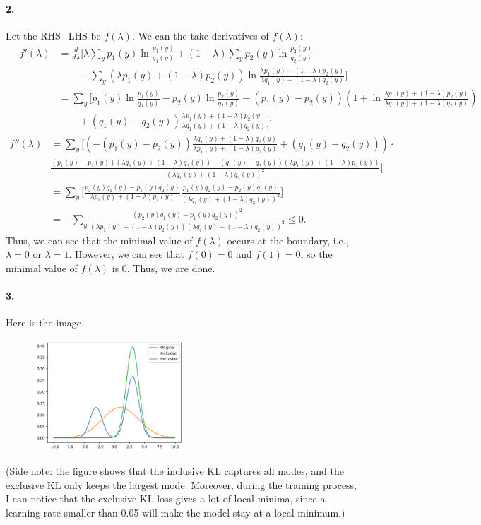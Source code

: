 \documentclass[a4 paper,12pt]{article}
\begin{document}
\paragraph*{2.} Let the RHS$-$LHS be $f(\lambda)$. We can the take derivatives of $f(\lambda)$:
\begin{align*}
\quad f'(\lambda)&=\frac{d}{d\lambda}\Big[\lambda\sum_{y}p_1(y)\ln \frac{p_1(y)}{q_1(y)}+(1-\lambda)\sum_{y}p_2(y)\ln \frac{p_2(y)}{q_2(y)}\\
&\qquad -\sum_{y}(\lambda p_1(y)+(1-\lambda)p_2(y))\ln \frac{\lambda p_1(y)+(1-\lambda)p_2(y)}{\lambda q_1(y)+(1-\lambda)q_2(y)}\Big]\\
&= \sum_{y}\Big[p_1(y)\ln \frac{p_1(y)}{q_1(y)}-p_2(y)\ln \frac{p_2(y)}{q_2(y)}-\left(p_1(y)-p_2(y)\right)\left(1+\ln \frac{\lambda p_1(y)+(1-\lambda)p_2(y)}{\lambda q_1(y)+(1-\lambda)q_2(y)}\right)\\
&\qquad +(q_1(y)-q_2(y))\frac{\lambda p_1(y)+(1-\lambda)p_2(y)}{\lambda q_1(y)+(1-\lambda)q_2(y)}\Big];
\end{align*}
\begin{align*}
f''(\lambda)&=\sum_y\Big[ \left(-(p_1(y)-p_2(y))\frac{\lambda q_1(y)+(1-\lambda)q_2(y)}{\lambda p_1(y)+(1-\lambda)p_2(y)}+(q_1(y)-q_2(y))\right)\cdot \\
&\frac{(p_1(y)-p_2(y))(\lambda q_1(y)+(1-\lambda)q_2(y))-(q_1(y)-q_2(y))(\lambda p_1(y)+(1-\lambda)p_2(y))}{(\lambda q_1(y)+(1-\lambda)q_2(y))^2}\Big]\\
&=\sum_y\Big[\frac{p_2(y)q_1(y)-p_1(y)q_2(y)}{\lambda p_1(y)+(1-\lambda)p_2(y)} \frac{p_1(y)q_2(y)-p_2(y)q_1(y)}{(\lambda q_1(y)+(1-\lambda)q_2(y))^2}\Big]\\
&=-\sum_y\frac{(p_2(y)q_1(y)-p_1(y)q_2(y))^2}{(\lambda p_1(y)+(1-\lambda)p_2(y))(\lambda q_1(y)+(1-\lambda)q_2(y))^2}\le 0.
\end{align*} Thus, we can see that the minimal value of $f(\lambda)$ occurs at the boundary, i.e., $\lambda=0$ or $\lambda=1$. However, we can see that $f(0)=0$ and $f(1)=0$, so the minimal value of $f(\lambda)$ is 0. Thus, we are done.

\paragraph*{3.}
Here is the image.
\begin{figure}[H]
	\centering
	\includegraphics[width=0.5\textwidth]{./output.png}
	\label{fig:myfigure}
\end{figure}
(Side note: the figure shows that the inclusive KL captures all modes, and the exclusive KL only keeps the largest mode. Moreover, during the training process, I can notice that the exclusive KL loss gives a lot of local minima, since a learning rate smaller than 0.05 will make the model stay at a local minimum.)
\end{document}
